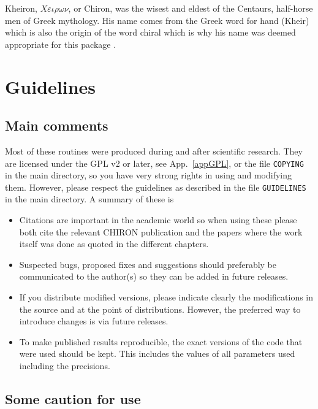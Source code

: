\documentclass[12pt,a4paper]{article}
\newcommand{\mytt}[1]{\texttt{#1}}
\begin{document}
Kheiron, $X\varepsilon\iota\rho\omega\nu$, or Chiron, was the wisest
and eldest of the Centaurs, half-horse men of Greek mythology.
His name comes from the Greek word for hand (Kheir)
which is also the origin of the word chiral which is why his name was deemed
appropriate for this package \cite{chiron}.

\section{Guidelines}
\label{guidelines}

\subsection{Main comments}

Most of these routines were produced during and after scientific research.
They are licensed under the GPL v2 or later, see App.~\ref{appGPL}, \cite{GPLv2}
or the file \mytt{COPYING} in the main directory, so you have very strong rights
in using and modifying them. However, please respect the guidelines as described
in the file \mytt{GUIDELINES} in the main directory. A summary of these
is
\begin{itemize}
\item Citations are important in the academic world so when using
these please both cite the relevant \textsc{CHIRON} publication
\cite{Bijnens:2014gsa} and the papers where the work itself was done
as quoted in the different chapters.
\item Suspected bugs, proposed fixes and suggestions should preferably be
communicated to the author(s) so they can be added in future releases.
\item If you distribute modified versions, please indicate clearly the
modifications in the source and at the point of distributions. However,
the preferred way to introduce changes is via future releases.
\item To make published results reproducible, the exact versions of the code
that were used should be kept. This includes the values of all parameters
used including the precisions.
\end{itemize}

\subsection{Some caution for use}
\end{document}
